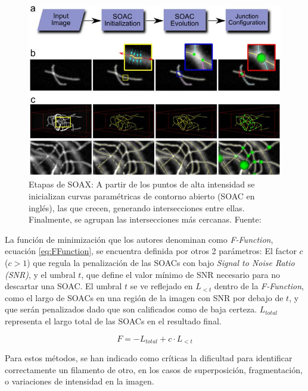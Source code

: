 \begin{figure}[h]
        \centering
        \includegraphics[scale=0.75]{imagenes/SOAX.jpg}
        \caption{Etapas de SOAX: A partir de los puntos de alta intensidad se inicializan curvas param\'etricas de contorno abierto (SOAC en ingl\'es), las que crecen, generando intersecciones entre ellas. Finalmente, se agrupan las intersecciones más cercanas. Fuente: \cite{xu2015soax}}
        \label{fig:SOAX}
\end{figure}

La funci\'on de minimizaci\'on que los autores denominan como  \textit{F-Function}, ecuaci\'on \eqref{eq:FFunction}, se encuentra definida por otros 2 par\'ametros: El factor $c$ ($c > 1$) que regula la penalizaci\'on de las SOACs con bajo \textit{Signal to Noise Ratio (SNR)}, y el umbral $t$, que define el valor mínimo de SNR necesario para no descartar una SOAC. El umbral $t$ se ve reflejado en $L_{<t}$ dentro de la \textit{F-Function}, como el largo de SOACs en una regi\'on de la imagen con SNR por debajo de $t$, y que ser\'an penalizados dado que son calificados como de baja certeza. $L_{total}$ representa el largo total de las SOACs en el resultado final.

\begin{equation}
   \label{eq:FFunction}
    F = -L_{total} + {c}\cdot L_{<t} 
\end{equation}


Para estos m\'etodos, se han indicado como cr\'iticas la dificultad para identificar correctamente un filamento de otro, en los casos de  superposici\'on, fragmentaci\'on, o variaciones de intensidad en la imagen.


